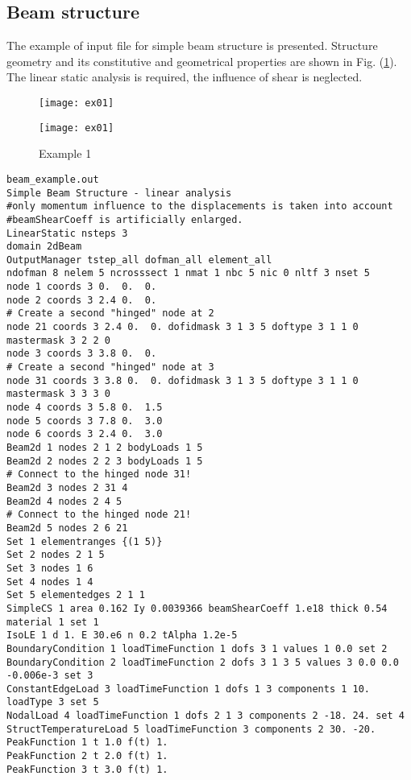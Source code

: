\documentclass[a4paper]{article}
\begin{document}
\subsection {Beam structure}
The example of input file for simple beam structure is presented.
Structure geometry and its constitutive and geometrical properties are shown in Fig. (\ref{ex01}).
The linear static analysis is required, the influence of shear is neglected.
\begin{figure}[htb]
\begin{htmlonly}
  \centerline{\texttt{[image: ex01]}}
\end{htmlonly}
\centerline{\texttt{[image: ex01]}}
\caption{Example 1}
\label{ex01}

\end{figure}
{\small\begin{verbatim}
beam_example.out
Simple Beam Structure - linear analysis
#only momentum influence to the displacements is taken into account
#beamShearCoeff is artificially enlarged.
LinearStatic nsteps 3
domain 2dBeam
OutputManager tstep_all dofman_all element_all
ndofman 8 nelem 5 ncrosssect 1 nmat 1 nbc 5 nic 0 nltf 3 nset 5
node 1 coords 3 0.  0.  0.
node 2 coords 3 2.4 0.  0.
# Create a second "hinged" node at 2
node 21 coords 3 2.4 0.  0. dofidmask 3 1 3 5 doftype 3 1 1 0 mastermask 3 2 2 0
node 3 coords 3 3.8 0.  0.
# Create a second "hinged" node at 3
node 31 coords 3 3.8 0.  0. dofidmask 3 1 3 5 doftype 3 1 1 0 mastermask 3 3 3 0
node 4 coords 3 5.8 0.  1.5
node 5 coords 3 7.8 0.  3.0
node 6 coords 3 2.4 0.  3.0
Beam2d 1 nodes 2 1 2 bodyLoads 1 5
Beam2d 2 nodes 2 2 3 bodyLoads 1 5
# Connect to the hinged node 31!
Beam2d 3 nodes 2 31 4
Beam2d 4 nodes 2 4 5
# Connect to the hinged node 21!
Beam2d 5 nodes 2 6 21
Set 1 elementranges {(1 5)}
Set 2 nodes 2 1 5
Set 3 nodes 1 6
Set 4 nodes 1 4
Set 5 elementedges 2 1 1
SimpleCS 1 area 0.162 Iy 0.0039366 beamShearCoeff 1.e18 thick 0.54 material 1 set 1
IsoLE 1 d 1. E 30.e6 n 0.2 tAlpha 1.2e-5
BoundaryCondition 1 loadTimeFunction 1 dofs 3 1 values 1 0.0 set 2
BoundaryCondition 2 loadTimeFunction 2 dofs 3 1 3 5 values 3 0.0 0.0 -0.006e-3 set 3
ConstantEdgeLoad 3 loadTimeFunction 1 dofs 1 3 components 1 10. loadType 3 set 5
NodalLoad 4 loadTimeFunction 1 dofs 2 1 3 components 2 -18. 24. set 4
StructTemperatureLoad 5 loadTimeFunction 3 components 2 30. -20.
PeakFunction 1 t 1.0 f(t) 1.
PeakFunction 2 t 2.0 f(t) 1.
PeakFunction 3 t 3.0 f(t) 1.
\end{verbatim}}
\end{document}
